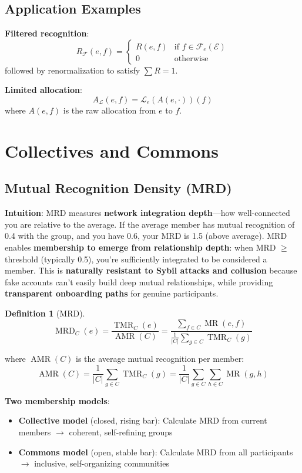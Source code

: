 \documentclass[11pt,a4paper]{article}
\theoremstyle{definition}
\newtheorem{definition}[theorem]{Definition}
\theoremstyle{remark}
\newcommand{\E}{\mathcal{E}}
\newcommand{\F}{\mathcal{F}}
\DeclareMathOperator{\TMR}{TMR}
\DeclareMathOperator{\MR}{MR}
\DeclareMathOperator{\MRD}{MRD}
\DeclareMathOperator{\AMR}{AMR}
\begin{document}
\subsection{Application Examples}

\textbf{Filtered recognition}:
\[ R_{\F}(e,f) = \begin{cases}
R(e,f) & \text{if } f \in \F_e(\E) \\
0 & \text{otherwise}
\end{cases} \]
followed by renormalization to satisfy $\sum R=1$.

\textbf{Limited allocation}:
\[ A_{\mathcal{L}}(e,f) = \mathcal{L}_e(A(e,\cdot))(f) \]
where $A(e,f)$ is the raw allocation from $e$ to $f$.

\section{Collectives and Commons}

\subsection{Mutual Recognition Density (MRD)}

\textbf{Intuition}: MRD measures \textbf{network integration depth}---how well-connected you are relative to the average. If the average member has mutual recognition of 0.4 with the group, and you have 0.6, your MRD is 1.5 (above average). MRD enables \textbf{membership to emerge from relationship depth}: when MRD $\ge$ threshold (typically 0.5), you're sufficiently integrated to be considered a member. This is \textbf{naturally resistant to Sybil attacks and collusion} because fake accounts can't easily build deep mutual relationships, while providing \textbf{transparent onboarding paths} for genuine participants.

\begin{definition}[MRD]
\[ \MRD_C(e) = \frac{\TMR_C(e)}{\AMR(C)} = \frac{\sum_{f \in C} \MR(e,f)}{\frac{1}{|C|}\sum_{g \in C} \TMR_C(g)} \]
\end{definition}

where $\AMR(C)$ is the average mutual recognition per member:
\[ \AMR(C) = \frac{1}{|C|} \sum_{g \in C} \TMR_C(g) = \frac{1}{|C|} \sum_{g \in C} \sum_{h \in C} \MR(g,h) \]

\textbf{Two membership models}:
\begin{itemize}
\item \textbf{Collective model} (closed, rising bar): Calculate MRD from current members $\rightarrow$ coherent, self-refining groups
\item \textbf{Commons model} (open, stable bar): Calculate MRD from all participants $\rightarrow$ inclusive, self-organizing communities
\end{itemize}
\end{document}
